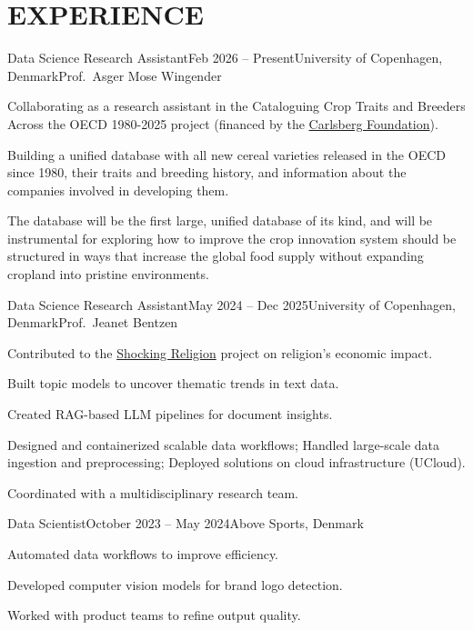 \documentclass{resume}
\begin{document}
\section{EXPERIENCE}
\begin{content}

    \begin{position}{Data Science Research Assistant}{Feb 2026 -- Present}{University of Copenhagen, Denmark}{Prof.~Asger Mose Wingender}{}
        \item Collaborating as a research assistant in the Cataloguing Crop Traits and Breeders Across the OECD 1980-2025 project (financed by the \href{https://www.carlsbergfondet.dk/en/}{Carlsberg Foundation}).
        \item Building a unified database with all new cereal varieties released in the OECD since 1980, their traits and breeding history, and information about the companies involved in developing them. 
        \item The database will be the first large, unified database of its kind, and will be instrumental for exploring how to improve the crop innovation system should be structured in ways that increase the global food supply without expanding cropland into pristine environments.
    \end{position}

    \begin{position}{Data Science Research Assistant}{May 2024 -- Dec 2025}{University of Copenhagen, Denmark}{Prof.~Jeanet Bentzen}{}
        \item Contributed to the {\href{https://www.economics.ku.dk/research/externally-funded-research_new/shocking-religion/}{Shocking Religion}} project on religion's economic impact.
        \item Built topic models to uncover thematic trends in text data.
        \item Created RAG-based LLM pipelines for document insights.
        \item Designed and containerized scalable data workflows; Handled large-scale data ingestion and preprocessing; Deployed solutions on cloud infrastructure (UCloud).
        \item Coordinated with a multidisciplinary research team.
    \end{position}
    
    \begin{position}{Data Scientist}{October 2023 -- May 2024}{Above Sports, Denmark}{}{}
        \item Automated data workflows to improve efficiency.
        \item Developed computer vision models for brand logo detection.
        \item Worked with product teams to refine output quality.
    \end{position}
    

\end{content}
\end{document}
